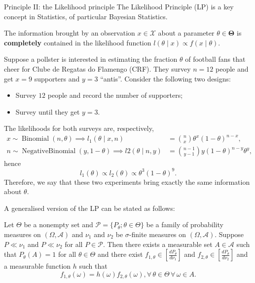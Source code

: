 \begin{frame}[allowframebreaks]{Principle II: the Likelihood principle}
The Likelihood Principle (LP) is a key concept in Statistics, of particular Bayesian Statistics.
\begin{idea}
\label{idea:LP}
 The information brought by an observation $x \in \mathcal{X}$ about a parameter $\theta \in \boldsymbol{\Theta}$ is \textbf{completely} contained in the likelihood function $l(\theta \mid x) \propto f(x \mid \theta)$.
\end{idea}
\begin{example}
 Suppose a pollster is interested in estimating the fraction $\theta$ of football fans that cheer for Clube de Regatas do Flamengo (CRF).
 They survey $n=12$ people and get $x=9$ supporters and $y=3$ ``antis''.
 Consider the following two designs:
 \begin{itemize}
  \item[i)] Survey $12$ people and record the number of supporters; 
  \item[ii)] Survey until they get $y=3$.
 \end{itemize}
The likelihoods for both surveys are, respectively,
\begin{align*}
x \sim \operatorname{Binomial}(n, \theta) \implies l_1(\theta \mid x, n) &= \binom{n}{x} \theta^{x}(1-\theta)^{n-x},\\
n \sim \operatorname{Negative Binomial}(y, 1-\theta) \implies l2(\theta \mid n, y) &=  \binom{n-1}{y-1}y (1-\theta)^{n-y} \theta^y,
\end{align*}
hence
\begin{equation*}
 l_1(\theta) \propto l_2(\theta) \propto \theta^{3}(1-\theta)^9.
\end{equation*}
Therefore, we say that these two experiments bring exactly the same information about $\theta$.
\end{example}
A generalised version of the LP can be stated as follows:
\begin{theorem}
 Let  $\Theta$ be a nonempty set and $\mathcal{P} = \{ P_\theta; \theta \in \Theta \}$ be a family of probability measures on $(\Omega, \mathcal{A})$ and $\nu_1$ and $\nu_2$ be $\sigma$-finite measures on $(\Omega, \mathcal{A})$.
 Suppose $P \ll \nu_1$ and $P \ll \nu_2$ for all $P \in \mathcal{P}$.
 Then there exists  a measurable set $A \in \mathcal{A}$  such that $P_\theta(A) = 1$ for all $\theta \in \Theta$ and there exist $f_{1,\theta} \in \left[ \frac{dP_\theta}{d\nu_1}\right]$ and $f_{2,\theta} \in \left[ \frac{dP_\theta}{d\nu_2}\right]$ and a measurable function $h$ such that
 \begin{equation*}
  f_{1,\theta}(\omega) = h(\omega)f_{2,\theta}(\omega), \forall\, \theta \in \Theta\, \forall\, \omega \in A.
 \end{equation*}
\end{theorem}
\end{frame}
